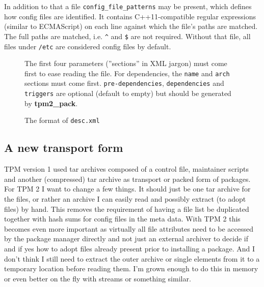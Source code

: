 \documentclass[a4paper]{scrartcl}
\newcommand{\file}[1]{\texttt{#1}}
\newcommand{\program}[1]{\textbf{#1}}
\begin{document}
	In addition to that a file \file{config\_file\_patterns} may be present, which defines how config files are identified. It contains C++11-compatible regular expressions (similar to ECMAScript) on each line against which the file's paths are matched. The full paths are matched, i.e. \texttt{\^} and \texttt{\$} are not required. Without that file, all files under \file{/etc} are considered config files by default.
	
	\begin{figure}[ht]
	
		\vspace{1eM}
	
		The first four parameters (''sections'' in XML jargon) must come first to ease reading the file. For dependencies, the \texttt{name} and \texttt{arch} sections must come first. \texttt{pre-dependencies}, \texttt{dependencies} and \texttt{triggers} are optional (default to empty) but should be generated by \program{tpm2\_pack}.
		
		\caption{The format of \file{desc.xml}}
		\label{fig:the_format_of_desc_xml}
	\end{figure}
	
	
	\subsection{A new transport form}
	\label{ssec:a_new_transport_form}
	
	TPM version 1 used tar archives composed of a control file, maintainer scripts and another (compressed) tar archive as transport or packed form of packages. For TPM 2 I want to change a few things. It should just be one tar archive for the files, or rather an archive I can easily read and possibly extract (to adopt files) by hand. This removes the requirement of having a file list be duplicated together with hash sums for config files in the meta data. With TPM 2 this becomes even more important as virtually all file attributes need to be accessed by the package manager directly and not just an external archiver to decide if and if yes how to adopt files already present prior to installing a package. And I don't think I still need to extract the outer archive or single elements from it to a temporary location before reading them. I'm grown enough to do this in memory or even better on the fly with streams or something similar.
	
\end{document}
